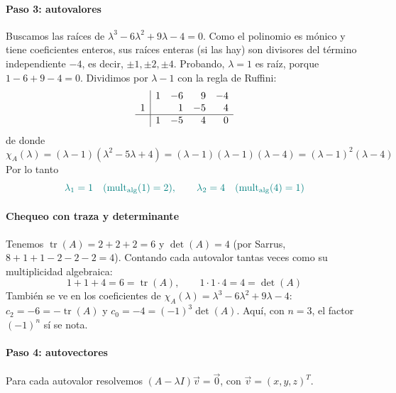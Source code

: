 \documentclass{article}
\newcommand{\vect}[1]{\vec{#1}}
\begin{document}
\paragraph*{Paso 3: autovalores}
Buscamos las raíces de \(\lambda^3-6\lambda^2+9\lambda-4=0\). Como el polinomio es mónico y tiene coeficientes enteros, sus raíces enteras (si las hay) son divisores del término independiente \(-4\), es decir, \(\pm1,\pm2,\pm4\). Probando, \(\lambda=1\) es raíz, porque \(1-6+9-4=0\). Dividimos por \(\lambda-1\) con la regla de Ruffini:
\[
\begin{array}{r|rrrr}
   & 1 & -6 & 9 & -4\\
 1 &   &  1 & -5 & 4\\ \hline
   & 1 & -5 & 4 & 0
\end{array}
\]
de donde
\[
\chi_A(\lambda)=(\lambda-1)(\lambda^2-5\lambda+4)=(\lambda-1)(\lambda-1)(\lambda-4)=(\lambda-1)^2(\lambda-4)
\]
Por lo tanto
\[\color{teal}
\lambda_1=1\quad(\mathrm{mult}_{\mathrm{alg}}(1)=2),
\qquad
\lambda_2=4\quad(\mathrm{mult}_{\mathrm{alg}}(4)=1)
\]

\paragraph*{Chequeo con traza y determinante}
Tenemos \(\operatorname{tr}(A)=2+2+2=6\) y \(\det(A)=4\) (por Sarrus, \(8+1+1-2-2-2=4\)). Contando cada autovalor tantas veces como su multiplicidad algebraica:
\[
1+1+4=6=\operatorname{tr}(A),
\qquad
1\cdot1\cdot4=4=\det(A)
\]
También se ve en los coeficientes de \(\chi_A(\lambda)=\lambda^3-6\lambda^2+9\lambda-4\): \(c_2=-6=-\operatorname{tr}(A)\) y \(c_0=-4=(-1)^3\det(A)\). Aquí, con \(n=3\), el factor \((-1)^n\) sí se nota.

\paragraph*{Paso 4: autovectores}
Para cada autovalor resolvemos \((A-\lambda I)\vect{v}=\vect{0}\), con \(\vect{v}=(x,y,z)^T\).
\end{document}
